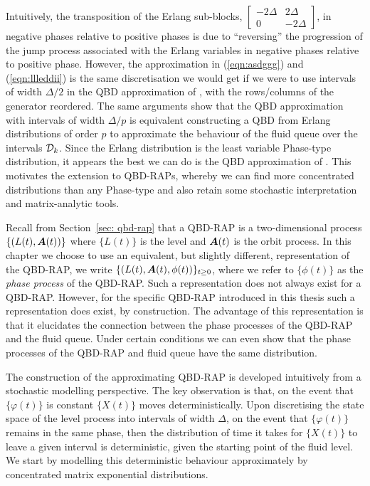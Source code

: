 Intuitively, the transposition of the Erlang sub-blocks, \(\left[\begin{array}{cc} -2\Delta & 2\Delta \\ 0 & -2\Delta \end{array}\right]\), in negative phases relative to positive phases is due to ``reversing'' the progression of the jump process associated with the Erlang variables in negative phases relative to positive phase. However, the approximation in (\ref{eqn:asdggg}) and (\ref{eqn:llleddii}) is the same discretisation we would get if we were to use intervals of width \(\Delta/2\) in the QBD approximation of \cite{bo2013}, with the rows/columns of the generator reordered. The same arguments show that the QBD approximation with intervals of width \(\Delta/p\) is equivalent constructing a QBD from Erlang distributions of order \(p\) to approximate the behaviour of the fluid queue over the intervals \(\mathcal{D}_k\). Since the Erlang distribution is the least variable Phase-type distribution, it appears the best we can do is the QBD approximation of \cite{bo2013}. %
This motivates the extension to QBD-RAPs, whereby we can find more concentrated distributions than any Phase-type and also retain some stochastic interpretation and matrix-analytic tools. 

Recall from Section~\ref{sec: qbd-rap} that a QBD-RAP is a two-dimensional process \(\{(L(t),\boldsymbol A(t))\}\) where \(\{L(t)\}\) is the level and \(\boldsymbol A(t)\) is the orbit process. In this chapter we choose to use an equivalent, but slightly different, representation of the QBD-RAP, we write \(\{(L(t),\boldsymbol A(t),\phi(t))\}_{t\geq 0}\), where we refer to \(\{\phi(t)\}\) as the \emph{phase process} of the QBD-RAP. Such a representation does not always exist for a QBD-RAP. However, for the specific QBD-RAP introduced in this thesis such a representation does exist, by construction. The advantage of this representation is that it elucidates the connection between the phase processes of the QBD-RAP and the fluid queue. Under certain conditions we can even show that the phase processes of the QBD-RAP and fluid queue have the same distribution.

The construction of the approximating QBD-RAP is developed intuitively from a stochastic modelling perspective. The key observation is that, on the event that \(\{\varphi(t)\}\) is constant \(\{X(t)\}\) moves deterministically. Upon discretising the state space of the level process into intervals of width \(\Delta\), on the event that \(\{\varphi(t)\}\) remains in the same phase, then the distribution of time it takes for \(\{X(t)\}\) to leave a given interval is deterministic, given the starting point of the fluid level. We start by modelling this deterministic behaviour approximately by concentrated matrix exponential distributions.%

